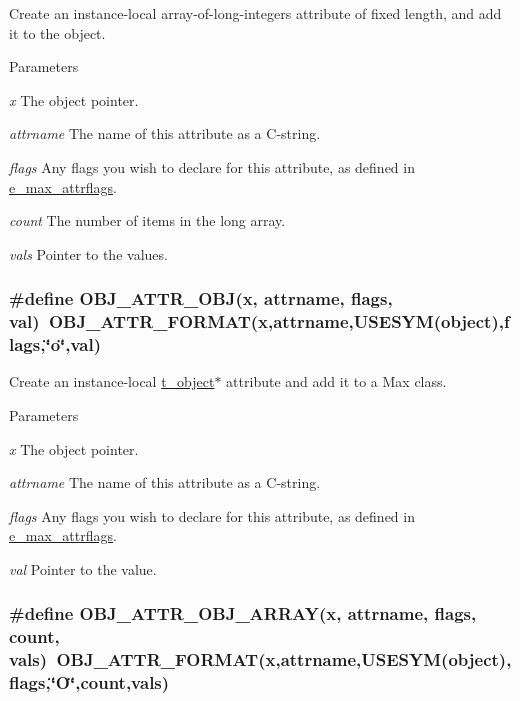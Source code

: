 Create an instance-\/local array-\/of-\/long-\/integers attribute of fixed length, and add it to the object. 
\begin{DoxyParams}{Parameters}
\item[{\em x}]The object pointer. \item[{\em attrname}]The name of this attribute as a C-\/string. \item[{\em flags}]Any flags you wish to declare for this attribute, as defined in \hyperlink{group__attr_gaf296cfc6741bb19207f6ed8062809115}{e\_\-max\_\-attrflags}. \item[{\em count}]The number of items in the long array. \item[{\em vals}]Pointer to the values. \end{DoxyParams}
\hypertarget{group__attr_gaa0de4abe5962141bd267bffaa9421e95}{
\subsubsection[{OBJ\_\-ATTR\_\-OBJ}]{\setlength{\rightskip}{0pt plus 5cm}\#define OBJ\_\-ATTR\_\-OBJ(x, \/  attrname, \/  flags, \/  val)~OBJ\_\-ATTR\_\-FORMAT(x,attrname,USESYM(object),flags,\char`\"{}o\char`\"{},val)}}
\label{group__attr_gaa0de4abe5962141bd267bffaa9421e95}


Create an instance-\/local \hyperlink{structt__object}{t\_\-object}$\ast$ attribute and add it to a Max class. 
\begin{DoxyParams}{Parameters}
\item[{\em x}]The object pointer. \item[{\em attrname}]The name of this attribute as a C-\/string. \item[{\em flags}]Any flags you wish to declare for this attribute, as defined in \hyperlink{group__attr_gaf296cfc6741bb19207f6ed8062809115}{e\_\-max\_\-attrflags}. \item[{\em val}]Pointer to the value. \end{DoxyParams}
\hypertarget{group__attr_ga41c69e626a725fddc6798eedbb24fafd}{
\subsubsection[{OBJ\_\-ATTR\_\-OBJ\_\-ARRAY}]{\setlength{\rightskip}{0pt plus 5cm}\#define OBJ\_\-ATTR\_\-OBJ\_\-ARRAY(x, \/  attrname, \/  flags, \/  count, \/  vals)~OBJ\_\-ATTR\_\-FORMAT(x,attrname,USESYM(object),flags,\char`\"{}O\char`\"{},count,vals)}}
\label{group__attr_ga41c69e626a725fddc6798eedbb24fafd}


